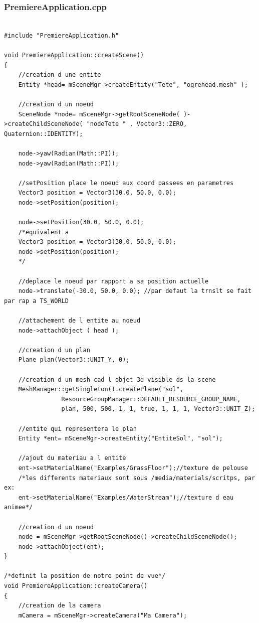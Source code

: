 \subsubsection{PremiereApplication.cpp}
\begin{lstlisting}[caption={PremiereApplication.cpp: Création de la caméra}]

#include "PremiereApplication.h"

void PremiereApplication::createScene()
{
    //creation d une entite
    Entity *head= mSceneMgr->createEntity("Tete", "ogrehead.mesh" );
    
    //creation d un noeud
    SceneNode *node= mSceneMgr->getRootSceneNode( )->createChildSceneNode( "nodeTete " , Vector3::ZERO, Quaternion::IDENTITY);
    
    node->yaw(Radian(Math::PI));
    node->yaw(Radian(Math::PI));

    //setPosition place le noeud aux coord passees en parametres
    Vector3 position = Vector3(30.0, 50.0, 0.0);
    node->setPosition(position);

    node->setPosition(30.0, 50.0, 0.0); 
    /*equivalent a
    Vector3 position = Vector3(30.0, 50.0, 0.0);
    node->setPosition(position);
    */

    //deplace le noeud par rapport a sa position actuelle
    node->translate(-30.0, 50.0, 0.0); //par defaut la trnslt se fait par rap a TS_WORLD
   
    //attachement de l entite au noeud
    node->attachObject ( head );

    //creation d un plan
    Plane plan(Vector3::UNIT_Y, 0);

    //creation d un mesh cad l objet 3d visible ds la scene
    MeshManager::getSingleton().createPlane("sol",
                ResourceGroupManager::DEFAULT_RESOURCE_GROUP_NAME,
                plan, 500, 500, 1, 1, true, 1, 1, 1, Vector3::UNIT_Z); 

    //entite qui representera le plan
    Entity *ent= mSceneMgr->createEntity("EntiteSol", "sol");

    //ajout du materiau a l entite
    ent->setMaterialName("Examples/GrassFloor");//texture de pelouse
    /*les differents materiaux sont sous /media/materials/scritps, par ex:
    ent->setMaterialName("Examples/WaterStream");//texture d eau animee*/

    //creation d un noeud
    node = mSceneMgr->getRootSceneNode()->createChildSceneNode();
    node->attachObject(ent);
}

/*definit la position de notre point de vue*/
void PremiereApplication::createCamera()
{
    //creation de la camera
    mCamera = mSceneMgr->createCamera("Ma Camera");


\end{lstlisting}
